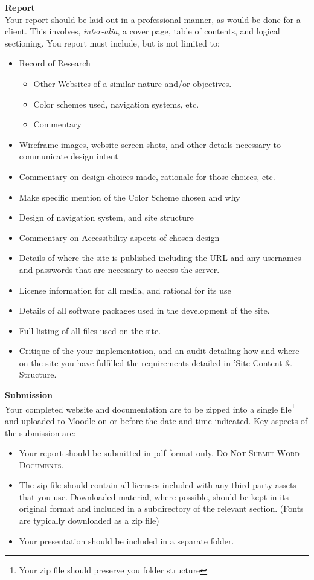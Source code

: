 \textbf{Report}\\
Your report should be laid out in a professional manner, as would be done for a client.  This involves, \emph{inter-alia}, a cover page, table of contents, and logical sectioning.  You report must include, but is not limited to:
\begin{itemize}
	\item Record of Research
		\begin{itemize}
			\item Other Websites of a similar nature and/or objectives.
			\item Color schemes used, navigation systems, etc.
			\item Commentary
		\end{itemize}
	\item Wireframe images, website screen shots, and other details necessary to communicate design intent
	\item Commentary on design choices made, rationale for those choices, etc.
	\item Make specific mention of the Color Scheme chosen and why
	\item Design of navigation system, and site structure
	\item Commentary on Accessibility aspects of chosen design
	\item Details of where the site is published including the URL and any usernames and passwords that are necessary to access the server.
	\item License information for all media, and rational for its use
	\item Details of all software packages used in the development of the site.
	\item Full listing of all files used on the site.
	\item Critique of the your implementation, and an audit detailing how and where on the site you have fulfilled the requirements detailed in 'Site Content \& Structure.
\end{itemize}
  
\vspace{1cm}





\textbf{Submission}\\
Your completed website and documentation are to be zipped into a single file\footnote{Your zip file should preserve you folder structure} and uploaded to Moodle on or before the date and time indicated.  Key aspects of the submission are:
\begin{itemize}
	\item Your report should be submitted in pdf format only.  \textsc{Do Not Submit Word Documents}.
	\item The zip file should contain all licenses included with any third party assets that you use.  Downloaded material, where possible, should be kept in its original format and included in a subdirectory of the relevant section.  (Fonts are typically downloaded as a zip file)
	\item Your presentation should be included in a separate folder.
\end{itemize}




